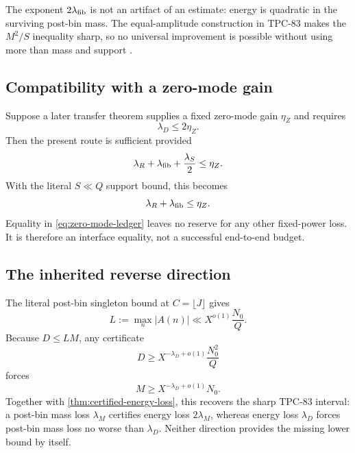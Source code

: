 \begin{remark}
The exponent \(2\lambda_{\rm fib}\) is not an artifact of an
estimate: energy is quadratic in the surviving post-bin mass.  The
equal-amplitude construction in TPC-83 makes the
\(M^2/S\) inequality sharp, so no universal improvement is possible
without using more than mass and support \citep{WangTPC83}.
\end{remark}

\subsection{Compatibility with a zero-mode gain}

Suppose a later transfer theorem supplies a fixed zero-mode gain
\(\eta_Z\) and requires
\begin{equation}
 \lambda_D\le2\eta_Z.
\label{eq:zero-mode-requirement}
\end{equation}
Then the present route is sufficient provided
\begin{equation}
 \lambda_R+\lambda_{\rm fib}
 +\frac{\lambda_S}{2}
 \le\eta_Z.
\label{eq:zero-mode-ledger}
\end{equation}
With the literal \(S\ll Q\) support bound, this becomes
\[
 \lambda_R+\lambda_{\rm fib}\le\eta_Z.
\]
Equality in \eqref{eq:zero-mode-ledger} leaves no reserve for any other
fixed-power loss.  It is therefore an interface equality, not a
successful end-to-end budget.

\subsection{The inherited reverse direction}

The literal post-bin singleton bound at \(C=\lfloor J\rfloor\) gives
\begin{equation}
 L:=\max_n|A(n)|
 \ll X^{o(1)}\frac{N_0}{Q}.
\label{eq:L-upper}
\end{equation}
Because \(D\le LM\), any certificate
\begin{equation}
 D\ge X^{-\lambda_D+o(1)}\frac{N_0^2}{Q}
\label{eq:D-certificate}
\end{equation}
forces
\begin{equation}
 M\ge X^{-\lambda_D+o(1)}N_0.
\label{eq:D-to-M}
\end{equation}
Together with \cref{thm:certified-energy-loss}, this recovers the
sharp TPC-83 interval: a post-bin mass loss \(\lambda_M\) certifies
energy loss \(2\lambda_M\), whereas energy loss \(\lambda_D\) forces
post-bin mass loss no worse than \(\lambda_D\).  Neither direction
provides the missing lower bound by itself.

